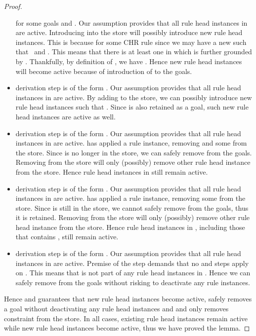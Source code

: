 \documentclass{tlp}
\begin{document}
\begin{proof}
\begin{itemize}
	        for some goals  and . Our assumption provides that all rule head instances
	        in  are active. Introducing  into the store will possibly introduce new rule head instances. 
	        This is because for some CHR rule  
	        since we may have a new  such that \  and 
	        . This means that there is at least one  in  
	        which is further grounded by . Thankfully, by definition of , we have . 
	        Hence new rule head instances will become active because of introduction of  to the goals.
	  \item {}  derivation step is of the form
	        . 
	        Our assumption provides that all rule head instances in  are active. By adding  to the
	        store, we can possibly introduce new rule head instances  such that .
	        Since  is also retained as a goal, such new rule head instances are active as well. 
	  \item {}  derivation step is of the form
	        . 
	        Our assumption provides that all rule head instances in  are active.  has applied a rule
	        instance, removing  and some  from the store. Since  is no longer in the store, we
	        can safely remove  from the goals. Removing  from the store will only (possibly) remove
	        other rule head instance from the store. Hence rule head instances in  still remain active. 
	  \item {}  derivation step is of the form
	        . 
	        Our assumption provides that all rule head instances in  are active.  has applied a rule
	        instance, removing some  from the store. Since  is still in the store, we
	        cannot safely remove  from the goals, thus it is retained. Removing  from the store will 
	        only (possibly) remove other rule head instance from the store. Hence rule head instances in ,
	        including those that contains , still remain active.
	  \item {}  derivation step is of the form
	        . Our assumption provides that 
	        all rule head instances in  are active. Premise of the  step demands that no 
	         and  steps apply on . This means that  is not part of
	        any rule head instances in . Hence we can safely remove  from the goals without risking 
	        to deactivate any rule instances.
  \end{itemize}
  Hence  and  guarantees that new rule head instances become active, 
  safely removes a goal without deactivating any rule head instances and  and 
  only removes constraint from the store. In all cases, existing rule head instances remain active while new rule
  head instances become active, thus we have proved the lemma.
\end{proof}
\end{document}
